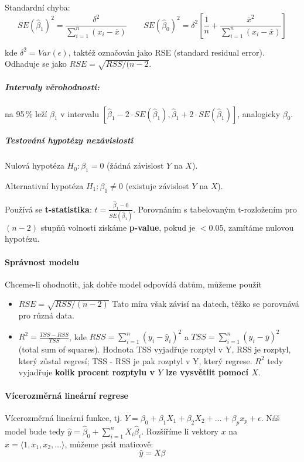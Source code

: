 \documentclass[11pt]{report} %
\numberwithin{equation}{section}
\begin{document}
Standardní chyba:
$$
SE(\hat{\beta}_1)^2 = \frac{\delta^2}{\sum_{i=1}^{n}(x_i - \overline{x})}
\qquad
SE(\hat{\beta}_0)^2 = \delta^2 \left[\frac{1}{n} + \frac{\overline{x}^2}{\sum_{i=1}^{n}(x_i - \overline{x})} \right]$$

kde $\delta^2 = Var(\epsilon)$, taktéž označován jako RSE (standard residual error). Odhaduje se jako $RSE = \sqrt{RSS/(n-2}$.

\subparagraph{Intervaly věrohodnosti:} na 95\,\% leží $\beta_1$ v intervalu $[\hat{\beta}_1 - 2\cdot SE(\hat{\beta}_1), \hat{\beta}_1 + 2\cdot SE(\hat{\beta}_1)]$, analogicky $\beta_0$.

\subparagraph{Testování hypotézy nezávislosti}
Nulová hypotéza $H_0: \beta_1 = 0$ (žádná závislost $Y$ na $X$).

Alternativní hypotéza $H_1: \beta_1 \neq 0$ (existuje závislost $Y$ na $X$).

Používá se \textbf{t-statistika}: $t = \frac{\hat\beta_1 - 0}{SE(\hat\beta_1)}$. Porovnáním s tabelovaným t-rozložením pro $(n-2)$ stupňů volnosti získáme \textbf{p-value}, pokud je $< 0.05$, zamítáme nulovou hypotézu.

\paragraph{Správnost modelu}
Chceme-li ohodnotit, jak dobře model odpovídá datům, můžeme použít
\begin{itemize}
	\item $RSE = \sqrt{RSS / (n-2)}$ Tato míra však závisí na datech, těžko se porovnává pro různá data.
	
	\item $R^2 = \frac{TSS - RSS}{TSS}$, kde $RSS = \sum_{i=1}^{n}(y_i - \hat{y}_i)^2$ a $TSS = \sum_{i=1}^{n}(y_i - \overline{y})^2$ (total sum of squares). Hodnota TSS vyjadřuje rozptyl v Y, RSS je rozptyl, který zůstal  regresí; TSS - RSS je pak rozptyl v Y, který  regrese. $R^2$ tedy vyjadřuje \textbf{kolik procent rozptylu v $Y$ lze vysvětlit pomocí $X$}.
\end{itemize}
\paragraph{Vícerozměrná lineární regrese}
Vícerozměrná lineární funkce, tj. $Y = \beta_0 + \beta_1X_1 + \beta_2X_2 + \dots + \beta_px_p + \epsilon$. Náš model bude tedy $\hat{y} = \hat{\beta}_0 + \sum_{i=1}^{n}X_i\hat{\beta}_i$. Rozšíříme li vektory $x$ na $x = \langle1, x_1, x_2,\dots\rangle$, můžeme psát maticově:
$$\hat{y} = X\beta$$
\end{document}
